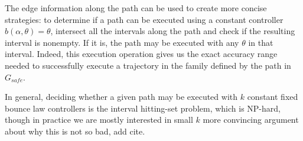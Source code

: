 \documentclass[]{styles/svproc}  %
\begin{document}
The edge
information along the path can be used to create more concise strategies: to
determine if a path can be executed using a constant controller $b(\alpha,
\theta) = \theta$, intersect all the intervals along the path and check if the
resulting interval is nonempty. If it is, the path may be executed with any
$\theta$ in that interval. Indeed, this execution operation gives us the exact
accuracy range needed to successfully execute a trajectory in the family defined
by the path in $G_{safe}$.


In general, deciding whether a given path may be
executed with $k$ constant fixed bounce law controllers is the interval
hitting-set problem, which is NP-hard, though in practice we are mostly
interested in small $k$ {\color{red} more convincing argument about why this is not so
bad, add cite}.


%


%




%

\end{document}
